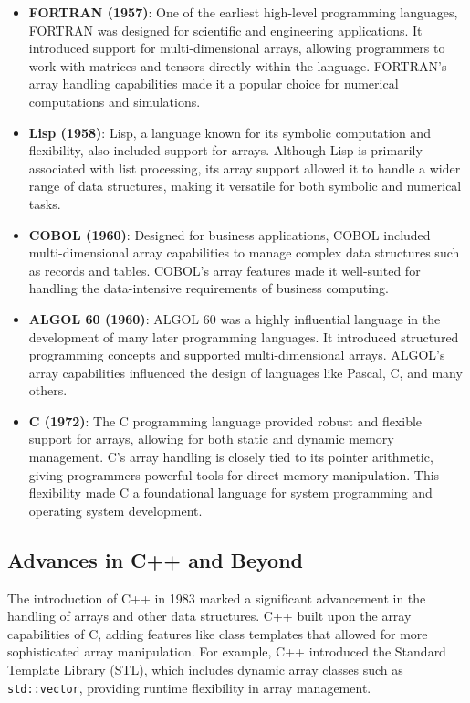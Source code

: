 \documentclass{book}
\begin{document}
	\begin{itemize}
		\item \textbf{FORTRAN (1957)}: One of the earliest high-level programming languages, FORTRAN was designed for scientific and engineering applications. It introduced support for multi-dimensional arrays, allowing programmers to work with matrices and tensors directly within the language. FORTRAN's array handling capabilities made it a popular choice for numerical computations and simulations.
		
		\item \textbf{Lisp (1958)}: Lisp, a language known for its symbolic computation and flexibility, also included support for arrays. Although Lisp is primarily associated with list processing, its array support allowed it to handle a wider range of data structures, making it versatile for both symbolic and numerical tasks.
		
		\item \textbf{COBOL (1960)}: Designed for business applications, COBOL included multi-dimensional array capabilities to manage complex data structures such as records and tables. COBOL's array features made it well-suited for handling the data-intensive requirements of business computing.
		
		\item \textbf{ALGOL 60 (1960)}: ALGOL 60 was a highly influential language in the development of many later programming languages. It introduced structured programming concepts and supported multi-dimensional arrays. ALGOL's array capabilities influenced the design of languages like Pascal, C, and many others.
		
		\item \textbf{C (1972)}: The C programming language provided robust and flexible support for arrays, allowing for both static and dynamic memory management. C's array handling is closely tied to its pointer arithmetic, giving programmers powerful tools for direct memory manipulation. This flexibility made C a foundational language for system programming and operating system development.
	\end{itemize}
	
	\subsection{Advances in C++ and Beyond}
	
	The introduction of C++ in 1983 marked a significant advancement in the handling of arrays and other data structures. C++ built upon the array capabilities of C, adding features like class templates that allowed for more sophisticated array manipulation. For example, C++ introduced the Standard Template Library (STL), which includes dynamic array classes such as \texttt{std::vector}, providing runtime flexibility in array management.
	
\end{document}
